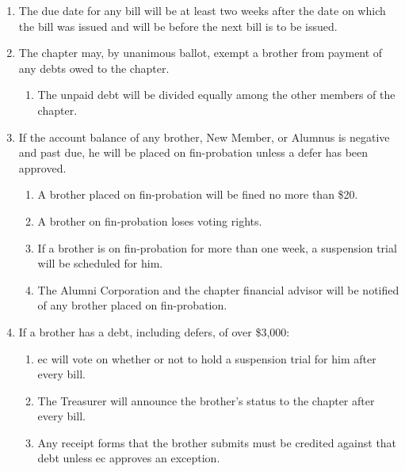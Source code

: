 	\begin{enumerate}
		\item The due date for any bill will be at least two weeks after the date on which the bill was issued and will be before the next bill is to be issued.

		\item The chapter may, by unanimous ballot, exempt a brother from payment of any debts owed to the chapter.
			\begin{enumerate}
				\item The unpaid debt will be divided equally among the other members of the chapter.
			\end{enumerate}

		\item If the account balance of any brother, New Member, or Alumnus is negative and past due, he will be placed on \gls{fin-probation} unless a \gls{defer} has been approved.
		\label{fin-probation}
			\begin{enumerate}
				\item A brother placed on \gls{fin-probation} will be fined no more than \$20.
				\item A brother on \gls{fin-probation} loses voting rights.
				\item If a brother is on \gls{fin-probation} for more than one week, a suspension trial will be scheduled for him.
				\item The Alumni Corporation and the chapter financial advisor will be notified of any brother placed on \gls{fin-probation}.
			\end{enumerate}

		\item If a brother has a debt, including \glspl{defer}, of over \$3,000:
			\begin{enumerate}
				\item \Gls{ec} will vote on whether or not to hold a suspension trial for him after every bill.
				\item The Treasurer will announce the brother's status to the chapter after every bill.
				\item Any receipt forms that the brother submits must be credited against that debt unless \gls{ec} approves an exception.
			\end{enumerate}

	\end{enumerate}
